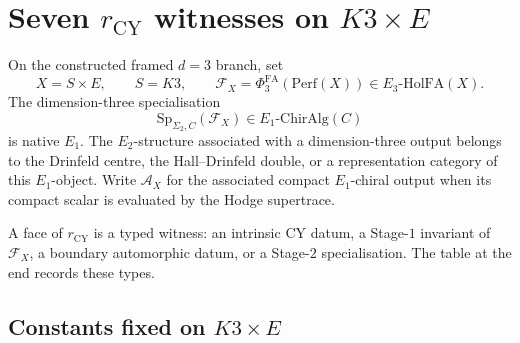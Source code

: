 \providecommand{\kBKM}{\kappa_{\mathrm{BKM}}}
\providecommand{\kch}{\kappa_{\mathrm{ch}}}
\providecommand{\kcat}{\kappa_{\mathrm{cat}}}
\providecommand{\kfib}{\kappa_{\mathrm{fiber}}}
\providecommand{\kHeis}{\kappa_{\mathrm{ch}}^{\mathrm{Heis}}}
\providecommand{\Sp}{\mathrm{Sp}}
\providecommand{\PhiFA}{\Phi^{\mathrm{FA}}}
\providecommand{\HolFA}{\mathrm{HolFA}}
\providecommand{\cA}{\mathcal{A}}
\providecommand{\cF}{\mathcal{F}}
\providecommand{\cL}{\mathcal{L}}
\providecommand{\cO}{\mathcal{O}}
\providecommand{\CC}{\mathbb{C}}
\providecommand{\HH}{\mathbb{H}}
\providecommand{\PP}{\mathbb{P}}
\providecommand{\QQ}{\mathbb{Q}}
\providecommand{\ZZ}{\mathbb{Z}}
\providecommand{\CoHA}{\mathrm{CoHA}}
\providecommand{\fg}{\mathfrak{g}}
\providecommand{\fh}{\mathfrak{h}}
\providecommand{\rCY}{r_{\mathrm{CY}}}
\providecommand{\Muk}{\mathrm{Muk}}
\providecommand{\Niem}{\mathrm{Niem}}
\providecommand{\Hum}{\mathrm{Hum}}
\providecommand{\Uchir}{U^{\mathrm{chir}}}
\providecommand{\heis}{\widehat{\fh}}
\providecommand{\bH}{\mathbf{H}}
\providecommand{\wt}{\mathrm{wt}}

\section{Seven $\rCY$ witnesses on $K3\times E$}
\label{wn:sec:seven-faces-enumerate}

On the constructed framed \(d=3\) branch, set
\[
  X=S\times E,\qquad S=K3,\qquad
  \cF_X=\PhiFA_3(\mathrm{Perf}(X))\in E_3\text{-}\HolFA(X).
\]
The dimension-three specialisation
\[
  \Sp_{\Sigma_2,C}(\cF_X)\in E_1\text{-}\mathrm{ChirAlg}(C)
\]
is native \(E_1\).  The \(E_2\)-structure associated with a
dimension-three output belongs to the Drinfeld centre, the Hall--Drinfeld
double, or a representation category of this \(E_1\)-object.
Write \(\cA_X\) for the associated compact \(E_1\)-chiral output when
its compact scalar is evaluated by the Hodge supertrace.

A face of \(\rCY\) is a typed witness: an intrinsic CY datum, a
Stage-\(1\) invariant of \(\cF_X\), a boundary automorphic datum, or a
Stage-\(2\) specialisation.  The table at the end records these types.

\subsection{Constants fixed on $K3\times E$}
\label{wn:subsec:constants-fixed-k3e}

